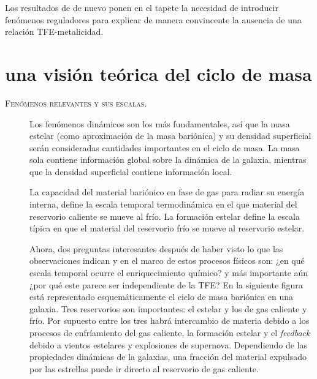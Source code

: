 \documentclass{article}
\begin{document}
\begin{description}
Los resultados de \citeauthor{Sanchez2013} de nuevo ponen en el tapete la necesidad de introducir
fenómenos reguladores para explicar de manera convincente la ausencia de una relación
TFE-metalicidad.
%
\end{description}


\section{una visión teórica del ciclo de masa}
%
\begin{description}
%
\item[\textsc{Fenómenos relevantes y sus escalas.}] Los fenómenos dinámicos son los más
fundamentales, así que la masa estelar (como aproximación de la masa bariónica) y su densidad
superficial serán consideradas cantidades importantes en el ciclo de masa. La masa sola contiene
información global sobre la dinámica de la galaxia, mientras que la densidad superficial contiene
información local.

La capacidad del material bariónico en fase de gas para radiar su energía interna, define la escala
temporal termodinámica en el que material del reservorio caliente se mueve al frío.
La formación estelar define la escala típica en que el material del reservorio frío se mueve al
reservorio estelar.

Ahora, dos preguntas interesantes después de haber visto lo que las observaciones indican y en el
marco de estos procesos físicos son:
%
¿en qué escala temporal ocurre el enriquecimiento químico?
%
y más importante aún ¿por qué este parece ser independiente de la TFE?
%
En la siguiente figura
está representado esquemáticamente el ciclo de masa bariónica en una galaxia. Tres reservorios son
importantes: el estelar y los de gas caliente y frío. Por supuesto entre los tres habrá intercambio
de materia debido a los procesos de enfríamiento del gas caliente, la formación estelar y el
\emph{feedback} debido a vientos estelares y explosiones de supernova. Dependiendo de las
propiedades dinámicas de la galaxias, una fracción del material expulsado por las estrellas puede ir
directo al reservorio de gas caliente.


\end{description}
\end{document}
